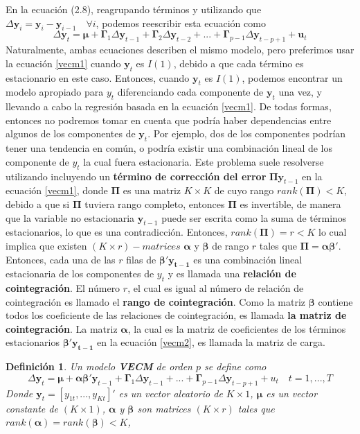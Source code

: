 \documentclass[12pt, twoside]{book}\usepackage[]{graphicx}\usepackage[]{color}
\let\bf\mathbf
\numberwithin{equation}{section}
\numberwithin{theorem}{section}
\numberwithin{teorema}{section}
\newtheorem{defi}{Definición}
\newenvironment{defin}
      {\begin{shaded}\begin{defi}}
      {\end{defi}\end{shaded}}
\numberwithin{defi}{section}
\numberwithin{prop}{section}
\numberwithin{defi}{section}
\theoremstyle{plain}
\begin{document}
En la ecuación (2.8), reagrupando términos y utilizando que $\Delta \bf{y}_{i} = \bf{y}_{i}-\bf{y}_{i-1}\quad \forall i$, podemos reescribir esta ecuación como 
\begin{equation}\label{vecm1}
\Delta \bf{y}_{t}=\mathbf{\mu}+\mathbf{\Gamma}_{1}\Delta \bf{y}_{t-1}+\mathbf{\Gamma}_{2}\Delta \bf{y}_{t-2}+...+\mathbf{\Gamma}_{p-1}\Delta \bf{y}_{t-p+1}+\bf{u}_{t}
\end{equation} 
Naturalmente, ambas ecuaciones describen el mismo modelo, pero preferimos usar la ecuación \eqref{vecm1} cuando $\bf{y}_{t}$ es $I(1)$, debido a que cada término es estacionario en este caso. Entonces, cuando $\bf{y}_{t}$ es $I(1)$, podemos encontrar un modelo apropiado para $y_{t}$ diferenciando cada componente de $\bf{y}_{t}$ una vez, y llevando a cabo la regresión basada en la ecuación \eqref{vecm1}. De todas formas, entonces no podremos tomar en cuenta que podría haber dependencias entre algunos de los componentes de $\bf{y}_{t}$. Por ejemplo, dos de los componentes podrían tener una tendencia en común, o podría existir una combinación lineal de los componente de $y_{t}$ la cual fuera estacionaria. Este problema suele resolverse utilizando incluyendo un \textbf{término de corrección del error} $\mathbf{\Pi}\bf{y}_{t-1}$ en la ecuación \eqref{vecm1}, donde $\mathbf{\Pi}$ es una matriz $K\times K$ de cuyo rango $rank(\mathbf{\Pi})<K$, debido a que si $\mathbf{\Pi}$ tuviera rango completo, entonces $\mathbf{\Pi}$  es invertible, de manera que la variable no estacionaria $\bf{y}_{t-1}$ puede ser escrita como la suma de términos estacionarios, lo que es una contradicción. Entonces, $rank(\mathbf{\Pi})=r<K$ lo cual implica que existen $(K\times r)-matrices$ $\boldsymbol{\alpha}$ y $\boldsymbol{\beta}$ de rango $r$ tales que $\mathbf{\Pi}=\boldsymbol{\alpha}\boldsymbol{\beta}'$. Entonces, cada una de las $r$ filas de $\boldsymbol{\beta}'\bf{y_{t-1}}$ es una combinación lineal estacionaria de los componentes de $y_{t}$ y es llamada una \textbf{relación de cointegración}. El número $r$, el cual es igual al número de relación de cointegración es llamado el \textbf{rango de cointegración}. Como la matriz $\boldsymbol{\beta}$ contiene todos los coeficiente de las relaciones de cointegración, es llamada \textbf{la matriz de cointegración}. La matriz $\boldsymbol{\alpha}$, la cual es la matriz de coeficientes de los términos estacionarios $\boldsymbol{\beta}'\bf{y_{t-1}}$ en la ecuación \eqref{vecm2}, es llamada la matriz de carga. 
\begin{defin}
Un modelo \textbf{VECM} de orden $p$ se define como 
\begin{equation}\label{vecm2}
\Delta \bf{y}_{t}=\boldsymbol{\mu}+\boldsymbol{\alpha\beta}'
\bf{y}_{t-1}+\mathbf{\Gamma}_{1}\Delta \bf{y}_{t-1}+...+\mathbf{\Gamma}_{p-1}\Delta \bf{y}_{t-p+1}+u_{t} \quad t=1,...,T
\end{equation}
Donde $\bf{y}_{t}=\left[y_{1t},...,y_{Kt}\right]'$ es un vector aleatorio de $K\times 1$, $\boldsymbol{\mu}$ es un vector constante de $(K\times 1)$, $\boldsymbol{\alpha}$ y $\boldsymbol{\beta}$ son matrices $(K\times r)$ tales que $rank(\boldsymbol{\alpha})=rank(\boldsymbol{\beta})<K$, 
\end{defin} 
\end{document}
